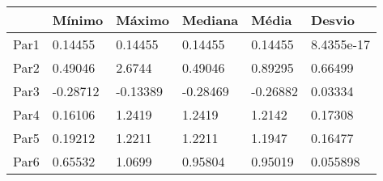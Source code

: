 \begin{tabular}{llllll}
& Mínimo & Máximo & Mediana & Média & Desvio \\ 
\hline 
Par1 & 0.14455 & 0.14455 & 0.14455 & 0.14455 & 8.4355e-17 \\ 
Par2 & 0.49046 & 2.6744 & 0.49046 & 0.89295 & 0.66499 \\ 
Par3 & -0.28712 & -0.13389 & -0.28469 & -0.26882 & 0.03334 \\ 
Par4 & 0.16106 & 1.2419 & 1.2419 & 1.2142 & 0.17308 \\ 
Par5 & 0.19212 & 1.2211 & 1.2211 & 1.1947 & 0.16477 \\ 
Par6 & 0.65532 & 1.0699 & 0.95804 & 0.95019 & 0.055898 \\ 
\hline 
\end{tabular}